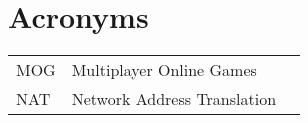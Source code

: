 
\chapter*{{\huge\rm\bfseries{Acronyms}}}

\scriptsize
\begin{table}[!h]
\vspace{-2.0cm}
\hspace{1.0cm}
\begin{tabular}{l l r}

\textsc{MOG}  &  Multiplayer Online Games \\ [1ex]
\textsc{NAT}  &  Network Address Translation \\ [1ex]



\end{tabular}
\end{table}










